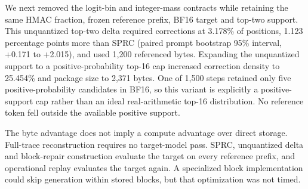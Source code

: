 \documentclass{nature}
\begin{document}
We next removed the logit-bin and integer-mass contracts while retaining the same HMAC fraction, frozen reference prefix, BF16 target and top-two support. This unquantized top-two delta required corrections at 3.178\% of positions, 1.123 percentage points more than SPRC (paired prompt bootstrap 95\% interval, +0.171 to +2.015), and used 1,200 referenced bytes. Expanding the unquantized support to a positive-probability top-16 cap increased correction density to 25.454\% and package size to 2,371 bytes. One of 1,500 steps retained only five positive-probability candidates in BF16, so this variant is explicitly a positive-support cap rather than an ideal real-arithmetic top-16 distribution. No reference token fell outside the available positive support.

The byte advantage does not imply a compute advantage over direct storage. Full-trace reconstruction requires no target-model pass. SPRC, unquantized delta and block-repair construction evaluate the target on every reference prefix, and operational replay evaluates the target again. A specialized block implementation could skip generation within stored blocks, but that optimization was not timed.
\end{document}
